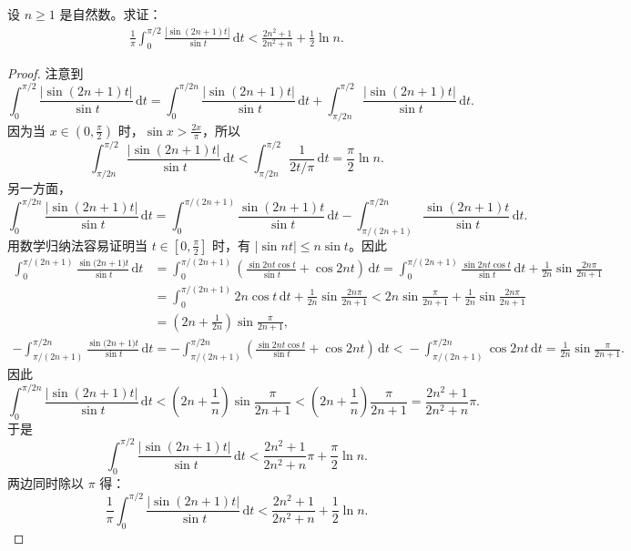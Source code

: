\documentclass[../../main.tex]{subfiles}
\begin{document}
\begin{example}
设 \( n \geqslant 1 \) 是自然数。求证：
\begin{align*}
\frac{1}{\pi} \int_{0}^{\pi/2} \frac{|\sin(2n + 1)t|}{\sin t} \, \mathrm{d}t < \frac{2n^2 + 1}{2n^2 + n} + \frac{1}{2} \ln n.
\end{align*}
\end{example}
\begin{proof}
注意到
\[
\int_{0}^{\pi/2} \frac{|\sin(2n + 1)t|}{\sin t} \, \mathrm{d}t = \int_{0}^{\pi/2n} \frac{|\sin(2n + 1)t|}{\sin t} \, \mathrm{d}t + \int_{\pi/2n}^{\pi/2} \frac{|\sin(2n + 1)t|}{\sin t} \, \mathrm{d}t.
\]
因为当 \( x \in \left( 0, \frac{\pi}{2} \right) \) 时，\( \sin x > \frac{2x}{\pi} \)，所以
\[
\int_{\pi/2n}^{\pi/2} \frac{|\sin(2n + 1)t|}{\sin t} \, \mathrm{d}t < \int_{\pi/2n}^{\pi/2} \frac{1}{2t/\pi} \, \mathrm{d}t = \frac{\pi}{2} \ln n.
\]
另一方面，
\[
\int_{0}^{\pi/2n} \frac{|\sin(2n + 1)t|}{\sin t} \, \mathrm{d}t = \int_{0}^{\pi/(2n + 1)} \frac{\sin(2n + 1)t}{\sin t} \, \mathrm{d}t - \int_{\pi/(2n + 1)}^{\pi/2n} \frac{\sin(2n + 1)t}{\sin t} \, \mathrm{d}t.
\]
用数学归纳法容易证明当 \( t \in \left[ 0, \frac{\pi}{2} \right] \) 时，有 \( |\sin nt| \leqslant n \sin t \)。因此
\begin{align*}
\int_0^{\pi/(2n+1)}{\frac{\sin\mathrm{(}2n+1)t}{\sin t}\,\mathrm{d}t}&=\int_0^{\pi/(2n+1)}{\left( \frac{\sin 2nt\cos t}{\sin t}+\cos 2nt \right) \,\mathrm{d}t=\int_0^{\pi/(2n+1)}{\frac{\sin 2nt\cos t}{\sin t}\,\mathrm{d}t}}+\frac{1}{2n}\sin \frac{2n\pi}{2n+1}
\\
&=\int_0^{\pi/(2n+1)}{2n\cos t\,\mathrm{d}t}+\frac{1}{2n}\sin \frac{2n\pi}{2n+1}<2n\sin \frac{\pi}{2n+1}+\frac{1}{2n}\sin \frac{2n\pi}{2n+1}
\\
&=\left( 2n+\frac{1}{2n} \right) \sin \frac{\pi}{2n+1},
\end{align*}
\begin{align*}
-\int_{\pi/(2n+1)}^{\pi/2n}{\frac{\sin\mathrm{(}2n+1)t}{\sin t}\,\mathrm{d}t}=-\int_{\pi/(2n+1)}^{\pi/2n}{\left( \frac{\sin 2nt\cos t}{\sin t}+\cos 2nt \right) \,\mathrm{d}t<}-\int_{\pi/(2n+1)}^{\pi/2n}{\cos 2nt\,\mathrm{d}t=\frac{1}{2n}\sin \frac{\pi}{2n+1}.}
\end{align*}
因此
\[
\int_{0}^{\pi/2n} \frac{|\sin(2n + 1)t|}{\sin t} \, \mathrm{d}t < \left( 2n + \frac{1}{n} \right) \sin \frac{\pi}{2n + 1} < \left( 2n + \frac{1}{n} \right) \frac{\pi}{2n + 1} = \frac{2n^2 + 1}{2n^2 + n} \pi.
\]
于是
\[
\int_{0}^{\pi/2} \frac{|\sin(2n + 1)t|}{\sin t} \, \mathrm{d}t < \frac{2n^2 + 1}{2n^2 + n} \pi + \frac{\pi}{2} \ln n.
\]
两边同时除以 \( \pi \) 得：
\[
\frac{1}{\pi} \int_{0}^{\pi/2} \frac{|\sin(2n + 1)t|}{\sin t} \, \mathrm{d}t < \frac{2n^2 + 1}{2n^2 + n} + \frac{1}{2} \ln n.
\]

\end{proof}
\end{document}
